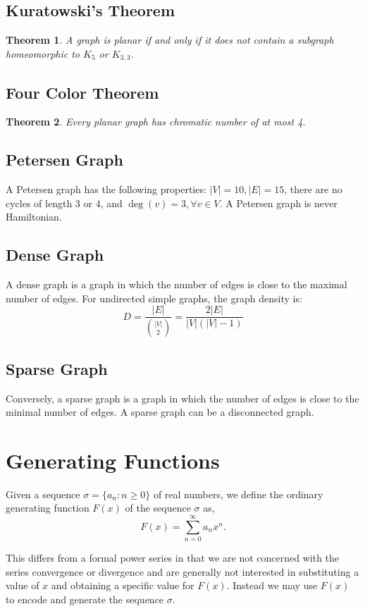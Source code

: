 \documentclass{article}
\newtheorem{theorem}{Theorem}[section]
\begin{document}
\subsection{Kuratowski's Theorem}
\begin{theorem}
A graph is planar if and only if it does not contain a subgraph homeomorphic to $K_5$ or $K_{3,3}$.
\end{theorem}

\subsection{Four Color Theorem}
\begin{theorem}
Every planar graph has chromatic number of at most 4.
\end{theorem}

\subsection{Petersen Graph}
A Petersen graph has the following properties: $|V| = 10, |E| = 15$, there are no cycles of length 3 or 4, and $\deg(v) = 3, \forall v \in V$. A Petersen graph is never Hamiltonian.

\subsection{Dense Graph}
A dense graph is a graph in which the number of edges is close to the maximal number of edges. For undirected simple graphs, the graph density is:
\[
D={\frac {|E|}{\binom {|V|}{2}}}={\frac {2|E|}{|V|(|V|-1)}}
\]
\subsection{Sparse Graph}
Conversely, a sparse graph is a graph in which the number of edges is close to the minimal number of edges. A sparse graph can be a disconnected graph.

\section{Generating Functions}
Given a sequence $\sigma=\{a_n:n\ge0\}$ of real numbers, we define the ordinary generating function $F(x)$ of the sequence $\sigma$ as,
\[
F(x)=\sum_{n=0}^\infty a_n x^n.
\]

This differs from a formal power series in that we are not concerned with the series convergence or divergence and are generally not interested in substituting a value of $x$ and obtaining a specific value for $F(x)$. Instead we may use $F(x)$ to encode and generate the sequence $\sigma$.
\end{document}
